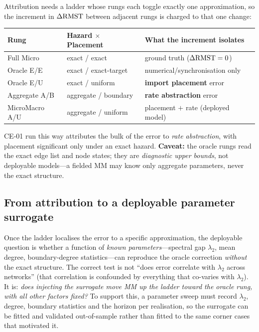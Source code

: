 \documentclass[11pt,a4paper]{article}
\begin{document}
Attribution needs a ladder whose rungs each toggle exactly one approximation, so
the increment in $\Delta\mathrm{RMST}$ between adjacent rungs is charged to that one change:

\begin{center}
\begin{tabular}{llp{6.2cm}}
\toprule
Rung & Hazard $\times$ Placement & What the increment isolates \\
\midrule
Full Micro                 & exact / exact     & ground truth ($\Delta\mathrm{RMST}=0$) \\
Oracle E/E                 & exact / exact-target & numerical/synchronisation only \\
Oracle E/U                 & exact / uniform   & \textbf{import placement} error \\
Aggregate A/B              & aggregate / boundary & \textbf{rate abstraction} error \\
MicroMacro A/U             & aggregate / uniform & placement $+$ rate (deployed model) \\
\bottomrule
\end{tabular}
\end{center}

CE-01 run this way attributes the bulk of the error to \emph{rate abstraction},
with placement significant only under an exact hazard.  \textbf{Caveat:} the
oracle rungs read the exact edge list and node states; they are \emph{diagnostic
upper bounds}, not deployable models---a fielded MM may know only aggregate
parameters, never the exact structure.

\subsection{From attribution to a deployable parameter surrogate}
\label{sec:surrogate}

Once the ladder localises the error to a specific approximation, the deployable
question is whether a function of \emph{known parameters}---spectral gap
$\lambda_2$, mean degree, boundary-degree statistics---can reproduce the oracle
correction \emph{without} the exact structure.  The correct test is not
``does error correlate with $\lambda_2$ across networks'' (that correlation is
confounded by everything that co-varies with $\lambda_2$).  It is: \emph{does
injecting the surrogate move MM up the ladder toward the oracle rung, with all
other factors fixed?}  To support this, a parameter sweep must record
$\lambda_2$, degree, boundary statistics and the horizon per realisation, so the
surrogate can be fitted and validated out-of-sample rather than fitted to the
same corner cases that motivated it.
\end{document}
